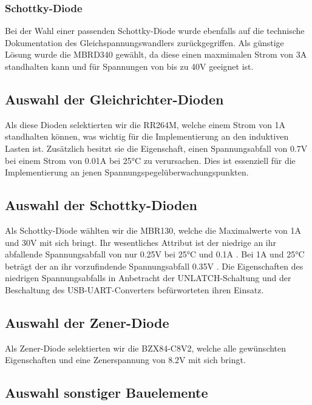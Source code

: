 \subsubsection{Schottky-Diode}
Bei der Wahl einer passenden Schottky-Diode wurde ebenfalls auf die technische Dokumentation des Gleichspannungswandlers zurückgegriffen.
Als günstige Lösung wurde die MBRD340 gewählt, da diese einen maxmimalen Strom von 3A standhalten kann und für Spannungen von bis zu 40V geeignet ist.

\subsection{Auswahl der Gleichrichter-Dioden}

Als diese Dioden selektierten wir die RR264M, welche einem Strom von 1A standhalten können, was wichtig für die Implementierung an den induktiven Lasten ist.
Zusätzlich besitzt sie die Eigenschaft, einen Spannungsabfall von 0.7V bei einem Strom von 0.01A bei 25°C zu verursachen.
Dies ist essenziell für die Implementierung an jenen Spannungspegelüberwachungspunkten.

\subsection{Auswahl der Schottky-Dioden}

Als Schottky-Diode wählten wir die MBR130, welche die Maximalwerte von 1A und 30V mit sich bringt.
Ihr wesentliches Attribut ist der niedrige an ihr abfallende Spannungsabfall von nur 0.25V bei 25°C und 0.1A .
Bei 1A und 25°C beträgt der an ihr vorzufindende Spannungsabfall 0.35V .
Die Eigenschaften des niedrigen Spannungsabfalls in Anbetracht der UNLATCH-Schaltung und der Beschaltung des USB-UART-Converters befürworteten ihren Einsatz.

\subsection{Auswahl der Zener-Diode}

Als Zener-Diode selektierten wir die BZX84-C8V2, welche alle gewünschten Eigenschaften und eine Zenerspannung von 8.2V mit sich bringt.

\subsection{Auswahl sonstiger Bauelemente}

